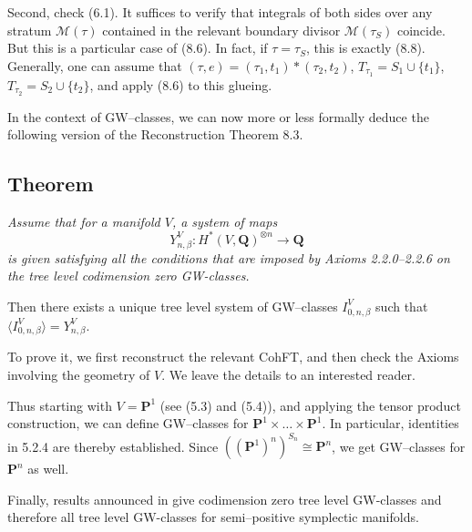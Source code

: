 \documentclass[reqno]{amsart}
\theoremstyle{definition}
\begin{document}
\smallskip

Second, check (6.1).
It suffices to verify that integrals of
both sides over any stratum $\mathcal{M}(\tau )$ contained in the
relevant boundary divisor $\mathcal{M}(\tau_S)$ coincide.
But this is a particular case of (8.6).
In fact, if $\tau =\tau_S$,
this is exactly (8.8). Generally,
one can assume that
$(\tau ,e)=(\tau_1,t_1)*(\tau_2,t_2)$,
$T_{\tau_1}=S_1\cup \{ t_1\}$,
$T_{\tau_2}=S_2\cup \{ t_2\}$, and
apply (8.6) to this glueing.

\medskip

In the context of GW--classes, we can now more or less formally
deduce the following version of the Reconstruction Theorem 8.3.

\medskip

\subsection{Theorem}
{\it
  Assume that for a manifold $V$,
  a system of maps
  \[
    Y^V_{n,\beta}\colon
    H^*(V,\mathbf{Q})^{\otimes n}\to \mathbf{Q}
  \]
  is given satisfying all the conditions that are imposed
  by Axioms 2.2.0--2.2.6 on the tree level codimension zero
  GW-classes.

  \smallskip

  Then there exists a unique tree level system of GW--classes
  $I^V_{0,n,\beta}$ such that $\langle I^V_{0,n,\beta}\rangle =
  Y^V_{n,\beta }$.
}

\medskip

To prove it, we first reconstruct the relevant CohFT, and then
check the Axioms involving the geometry of $V$. We leave the details
to an interested reader.

\smallskip

Thus starting with $V=\mathbf{P}^1$ (see (5.3) and (5.4)),
and applying the tensor product construction, we can
define GW--classes for $\mathbf{P}^1\times\dots\times\mathbf{P}^1$.
In particular, identities in 5.2.4 are thereby established.
Since $((\mathbf{P}^1)^n)^{S_n}\cong\mathbf{P}^n$, we get
GW--classes for $\mathbf{P}^n$ as well.

\smallskip

Finally, results announced in \cite{RT} give codimension zero
tree level GW-classes and therefore
all tree
level GW-classes for semi--positive symplectic manifolds.

\newpage
\end{document}
